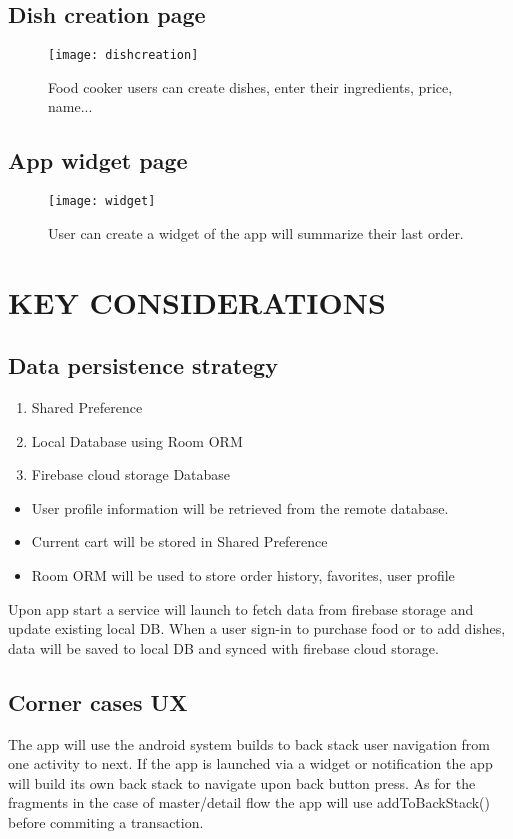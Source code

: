 \documentclass{article}
\begin{document}
    \subsection{Dish creation page}
    \begin{figure}[!ht]
    \centering
    \texttt{[image: dishcreation]}
    \caption{Food cooker users can create dishes, enter their ingredients, price, name... } 
    \label{fig:dishcreation}
    \end{figure}

    \subsection{App widget page}
    \begin{figure}[!ht]
    \centering
    \texttt{[image: widget]}
    \caption{User can create a widget of the app will summarize their last order. }
    \label{fig:widget}
    \end{figure}



\section{KEY CONSIDERATIONS}
\subsection{Data persistence strategy}
  \begin{enumerate}
    \item Shared Preference
    \item Local Database using Room ORM
    \item Firebase cloud storage Database
  \end{enumerate}
  \begin{itemize}
    \item User profile information will be retrieved from the remote database.
    \item Current cart will be stored in Shared Preference
    \item Room ORM will be used to store order history, favorites, user profile
  \end{itemize}
  Upon app start a service will launch to fetch data from firebase storage and update existing local DB.
  When a user sign-in to purchase food or to add dishes, data will be saved to local DB and synced with firebase cloud storage.

\subsection{Corner cases UX}
  The app will use the android system builds to back stack user navigation from one activity to next.
  If the app is launched via a widget or notification the app will build its own back stack to navigate upon back button press.
  As for the fragments in the case of master/detail flow the app will use addToBackStack() before commiting a transaction.
\end{document}
